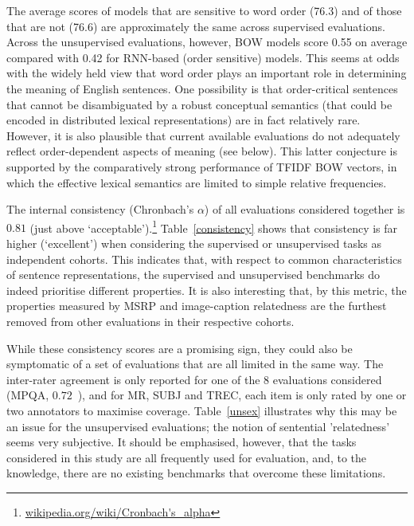 \vspace{5pt} 
The average scores of models that are sensitive to word order (76.3) and of those that are not (76.6) are approximately the same across supervised evaluations. Across the unsupervised evaluations, however, BOW models score 0.55 on average compared with 0.42 for RNN-based (order sensitive) models. This seems at odds with the widely held view that word order plays an important role in determining the meaning of English sentences. One possibility is that order-critical sentences that cannot be disambiguated by a robust conceptual semantics (that could be encoded in distributed lexical representations) are in fact relatively rare. However, it is also plausible that current available evaluations do not adequately reflect order-dependent aspects of meaning (see below). This latter conjecture is supported by the comparatively strong performance of TFIDF BOW vectors, in which the effective lexical semantics are limited to simple relative frequencies.  

\vspace{5pt} The internal consistency (Chronbach's \(\alpha\)) of all evaluations considered together is \(0.81\) (just above `acceptable').\footnote{\url{wikipedia.org/wiki/Cronbach's_alpha}} Table~\ref{consistency} shows that consistency is far higher (`excellent') when considering the supervised or unsupervised tasks as independent cohorts. This indicates that, with respect to common characteristics of sentence representations, the supervised and unsupervised benchmarks do indeed prioritise different properties. It is also interesting that, by this metric, the properties measured by MSRP and image-caption relatedness are the furthest removed from other evaluations in their respective cohorts.

While these consistency scores are a promising sign, they could also be symptomatic of a set of evaluations that are all limited in the same way. The inter-rater agreement is only reported for one of the 8 evaluations considered (MPQA, \(0.72\)~\citep{wiebe2005annotating}), and for MR, SUBJ and TREC, each item is only rated by one or two annotators to maximise coverage. Table~\ref{unsex} illustrates why this may be an issue for the unsupervised evaluations; the notion of sentential 'relatedness' seems very subjective. It should be emphasised, however, that the tasks considered in this study are all frequently used for evaluation, and, to the knowledge, there are no existing benchmarks that overcome these limitations. 
\vspace{4mm}

